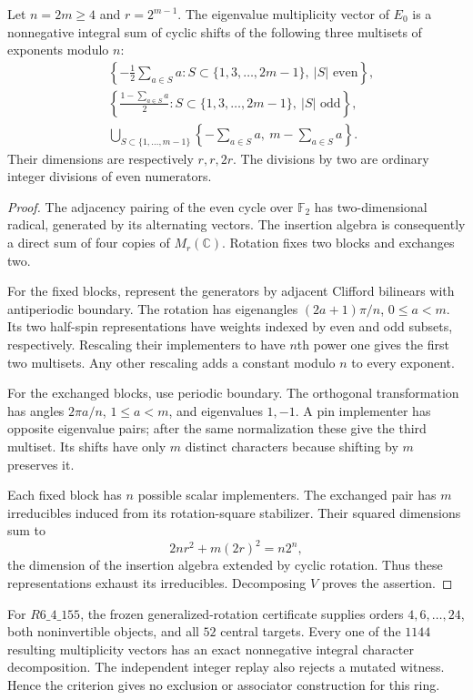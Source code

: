 \begin{proposition}
Let $n=2m\ge4$ and $r=2^{m-1}$. The eigenvalue multiplicity vector of
$E_0$ is a nonnegative integral sum of cyclic shifts of the following
three multisets of exponents modulo $n$:
\begin{align*}
 &\left\{-\frac12\sum_{a\in S}a:
       S\subset\{1,3,\ldots,2m-1\},\ |S|\text{ even}\right\},\\
 &\left\{\frac{1-\sum_{a\in S}a}{2}:
       S\subset\{1,3,\ldots,2m-1\},\ |S|\text{ odd}\right\},\\
 &\bigcup_{S\subset\{1,\ldots,m-1\}}
       \left\{-\sum_{a\in S}a,\ m-\sum_{a\in S}a\right\}.
\end{align*}
Their dimensions are respectively $r,r,2r$. The divisions by two are
ordinary integer divisions of even numerators.
\end{proposition}
\begin{proof}
The adjacency pairing of the even cycle over $\mathbb F_2$ has
two-dimensional radical, generated by its alternating vectors. The
insertion algebra is consequently a direct sum of four copies of
$M_r(\mathbb C)$. Rotation fixes two blocks and exchanges two.

For the fixed blocks, represent the generators by adjacent Clifford
bilinears with antiperiodic boundary. The rotation has eigenangles
$(2a+1)\pi/n$, $0\le a<m$. Its two half-spin representations have
weights indexed by even and odd subsets, respectively. Rescaling their
implementers to have $n$th power one gives the first two multisets.
Any other rescaling adds a constant modulo $n$ to every exponent.

For the exchanged blocks, use periodic boundary. The orthogonal
transformation has angles $2\pi a/n$, $1\le a<m$, and eigenvalues
$1,-1$. A pin implementer has opposite eigenvalue pairs; after the same
normalization these give the third multiset. Its shifts have only $m$
distinct characters because shifting by $m$ preserves it.

Each fixed block has $n$ possible scalar implementers. The exchanged
pair has $m$ irreducibles induced from its rotation-square stabilizer.
Their squared dimensions sum to
\[
 2nr^2+m(2r)^2=n2^n,
\]
the dimension of the insertion algebra extended by cyclic rotation.
Thus these representations exhaust its irreducibles. Decomposing $V$
proves the assertion.
\end{proof}

For $R6\_4\_155$, the frozen generalized-rotation certificate supplies
orders $4,6,\ldots,24$, both noninvertible objects, and all $52$ central
targets. Every one of the $1144$ resulting multiplicity vectors has an
exact nonnegative integral character decomposition. The independent
integer replay also rejects a mutated witness. Hence the criterion
gives no exclusion or associator construction for this ring.

